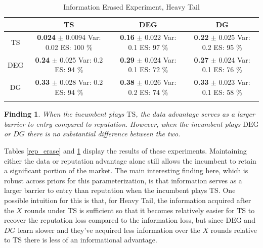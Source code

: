 \documentclass[letterpaper]{article}
\theoremstyle{definition}
\newtheorem{finding}{Finding}
\newcommand{\TS}{\mathrm{TS}}
\newcommand{\DEG}{\mathrm{DEG}}
\begin{document}
\begin{table}[ht]
\centering
\caption{Information Erased Experiment, Heavy Tail}
\begin{tabular}{c@{\hspace{1.0\tabcolsep}}ccc}
  \hline
 & TS & DEG &  DG \\
  \hline
TS & \makecell{\textbf{ 0.024 } $\pm$ 0.0094 \\Var: 0.02 \\ ES: 100 \%} & \makecell{\textbf{ 0.16 } $\pm$ 0.022 \\Var: 0.1 \\ ES: 97 \%} & \makecell{\textbf{ 0.22 } $\pm$ 0.025 \\Var: 0.2 \\ ES: 95 \%} \\
  DEG & \makecell{\textbf{ 0.24 } $\pm$ 0.025 \\Var: 0.2 \\ ES: 94 \%} & \makecell{\textbf{ 0.29 } $\pm$ 0.024 \\Var: 0.1 \\ ES: 72 \%} & \makecell{\textbf{ 0.27 } $\pm$ 0.024 \\Var: 0.1 \\ ES: 76 \%} \\
   DG & \makecell{\textbf{ 0.33 } $\pm$ 0.028 \\Var: 0.2 \\ ES: 94 \%} & \makecell{\textbf{ 0.38 } $\pm$ 0.026 \\Var: 0.2 \\ ES: 74 \%} & \makecell{\textbf{ 0.33 } $\pm$ 0.023 \\Var: 0.1 \\ ES: 58 \%} \\
   \hline
   \label{info_erase}
\end{tabular}
\end{table}

\begin{finding}
\textit{When the incumbent plays $\TS$, the data advantage serves as a larger barrier to entry compared to reputation. However, when the incumbent plays $\DEG$ or $DG$ there is no substantial difference between the two.}
\end{finding}

Tables \ref{rep_erase} and \ref{info_erase} display the results of these experiments. Maintaining either the data or reputation advantage alone still allows the incumbent to retain a significant portion of the market. The main interesting finding here, which is robust across priors for this parameterization, is that information serves as a larger barrier to entry than reputation when the incumbent plays $\TS$. One possible intuition for this is that, for Heavy Tail, the information acquired after the $X$ rounds under $\TS$ is sufficient so that it becomes relatively easier for $\TS$ to recover the reputation loss compared to the information loss, but since $\DEG$ and $DG$ learn slower and they've acquired less information over the $X$ rounds relative to $\TS$ there is less of an informational advantage.
\end{document}
